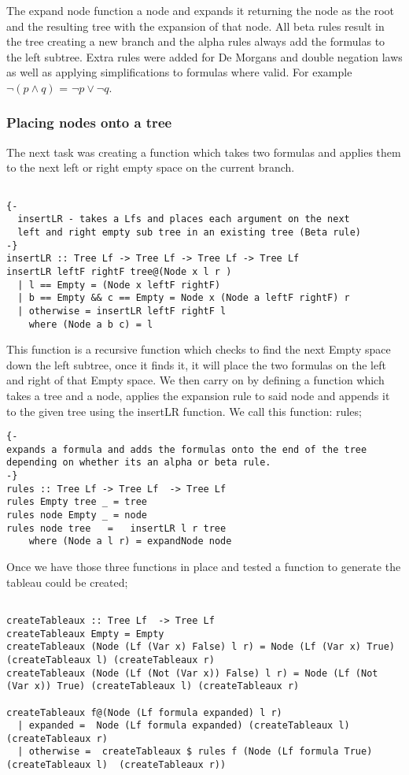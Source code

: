 \documentclass{article}%
\begin{document}
The expand node function a node and expands it returning the node as the root and the resulting tree with the expansion of that node. All beta rules result in the tree creating a new branch and the alpha rules always add the formulas to the left subtree. Extra rules were added for De Morgans and double negation laws as well as applying simplifications to formulas where valid. For example $\neg{(p\land q)}$ = $\neg{p} \lor \neg{q}$.

\subsubsection{Placing nodes onto a tree}
The next task was creating a function which takes two formulas and applies them to the next left or right empty space on the current branch. 
\begin{verbatim}

{-
  insertLR - takes a Lfs and places each argument on the next 
  left and right empty sub tree in an existing tree (Beta rule)
-}
insertLR :: Tree Lf -> Tree Lf -> Tree Lf -> Tree Lf 
insertLR leftF rightF tree@(Node x l r )
  | l == Empty = (Node x leftF rightF)
  | b == Empty && c == Empty = Node x (Node a leftF rightF) r
  | otherwise = insertLR leftF rightF l 
    where (Node a b c) = l
\end{verbatim}
This function is a recursive function which checks to find the next Empty space down the left subtree, once it finds it, it will place the two formulas on the left and right of that Empty space. 
We then carry on by defining a function which takes a tree and a node, applies the expansion rule to said node and appends it to the given tree using the insertLR function. We call this function: rules;
\begin{verbatim}
{-
expands a formula and adds the formulas onto the end of the tree depending on whether its an alpha or beta rule.
-}
rules :: Tree Lf -> Tree Lf  -> Tree Lf 
rules Empty tree _ = tree 
rules node Empty _ = node
rules node tree   =   insertLR l r tree
    where (Node a l r) = expandNode node 
\end{verbatim}
Once we have those three functions in place and tested a function to generate the tableau could be created;
\begin{verbatim}

createTableaux :: Tree Lf  -> Tree Lf
createTableaux Empty = Empty 
createTableaux (Node (Lf (Var x) False) l r) = Node (Lf (Var x) True) (createTableaux l) (createTableaux r)  
createTableaux (Node (Lf (Not (Var x)) False) l r) = Node (Lf (Not (Var x)) True) (createTableaux l) (createTableaux r)  

createTableaux f@(Node (Lf formula expanded) l r)
  | expanded =  Node (Lf formula expanded) (createTableaux l) (createTableaux r)
  | otherwise =  createTableaux $ rules f (Node (Lf formula True) (createTableaux l)  (createTableaux r)) 
\end{verbatim}
\end{document}
